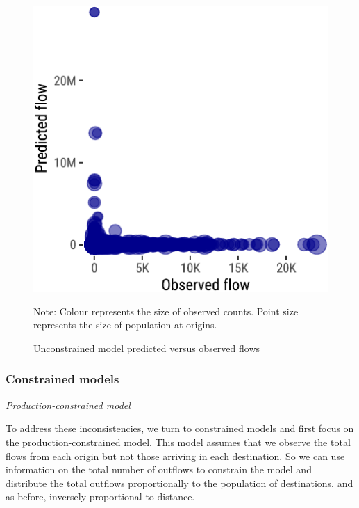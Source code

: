 \documentclass[
  a4paper, 
  twoside,
  final
]{article}
\begin{document}
\begin{figure}
{\includegraphics{region-quarto-template_files/figure-pdf/unnamed-chunk-4-1.pdf}

Note: Colour represents the size of observed counts. Point size
represents the size of population at origins.

}

\caption{\label{fig-1}Unconstrained model predicted versus observed
flows}

\end{figure}%

\subsubsection{Constrained models}\label{constrained-models}

\emph{Production-constrained model}

To address these inconsistencies, we turn to constrained models and
first focus on the production-constrained model. This model assumes that
we observe the total flows from each origin but not those arriving in
each destination. So we can use information on the total number of
outflows to constrain the model and distribute the total outflows
proportionally to the population of destinations, and as before,
inversely proportional to distance.
\end{document}

